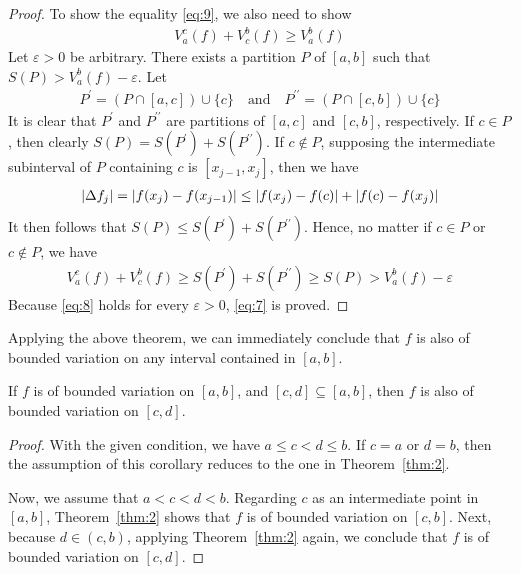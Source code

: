\documentclass[thmcnt=section, color=blue, 12pt]{my-elegantbook}
\begin{document}
\begin{proof}
	To show the equality \eqref{eq:9}, we also need to show
	\begin{align}
		V_a^c(f) + V_c^b(f) \geq V_a^b (f)
		\label{eq:7}
	\end{align}
	Let $\varepsilon > 0$ be arbitrary.
	There exists a partition $P$ of $[a, b]$
	such that $S(P) > V_a^b(f) - \varepsilon$.
	Let
	\begin{align*}
		P^\prime = ( P \cap [a, c] ) \cup \{c\} \quad \text{and} \quad
		P^{\prime\prime} = ( P \cap [c, b] ) \cup \{c\}
	\end{align*}
	It is clear that $P^\prime$ and $P^{\prime\prime}$
	are partitions of $[a, c]$ and $[c, b]$, respectively.
	If $c \in P$, then clearly $S(P) = S(P^\prime) + S(P^{\prime\prime})$.
	If $c \notin P$, supposing the intermediate
	subinterval of $P$ containing $c$ is $[x_{j-1}, x_j]$,
	then we have
	\begin{align*}
		\left\lvert \Delta f_j \right\rvert = \left\lvert f(x_j) - f(x_{j-1}) \right\rvert
		\leq \left\lvert f(x_j) - f(c) \right\rvert + \left\lvert f(c) -  f(x_j) \right\rvert
	\end{align*}
	It then follows that $S(P) \leq S(P^\prime) + S(P^{\prime\prime})$.
	Hence, no matter if $c \in P$ or $c \notin P$, we have
	\begin{align}
		V_a^c(f) + V_c^b(f) \geq S(P^\prime) + S(P^{\prime\prime}) \geq S(P) > V_a^b(f) - \varepsilon
		\label{eq:8}
	\end{align}
	Because \eqref{eq:8} holds for every $\varepsilon > 0$, \eqref{eq:7} is proved.
\end{proof}

Applying the above theorem, we can immediately conclude that $f$
is also of bounded variation on any interval contained in $[a, b]$.

\begin{corollary} \label{cor:1}
	If $f$ is of bounded variation on $[a, b]$,
	and $[c, d] \subseteq [a, b]$,
	then $f$ is also of bounded variation on $[c, d]$.
\end{corollary}

\begin{proof}
	With the given condition, we have $a \leq c < d \leq b$.
	If $c = a$ or $d = b$,
	then the assumption of this corollary reduces to the one in Theorem~\ref{thm:2}.

	Now, we assume that $a < c < d <b$.
	Regarding $c$ as an intermediate point in $[a, b]$,
	Theorem~\ref{thm:2} shows that $f$ is of bounded variation on $[c, b]$.
	Next, because $d \in (c, b)$, applying Theorem~\ref{thm:2} again,
	we conclude that $f$ is of bounded variation on $[c, d]$.
\end{proof}
\end{document}

